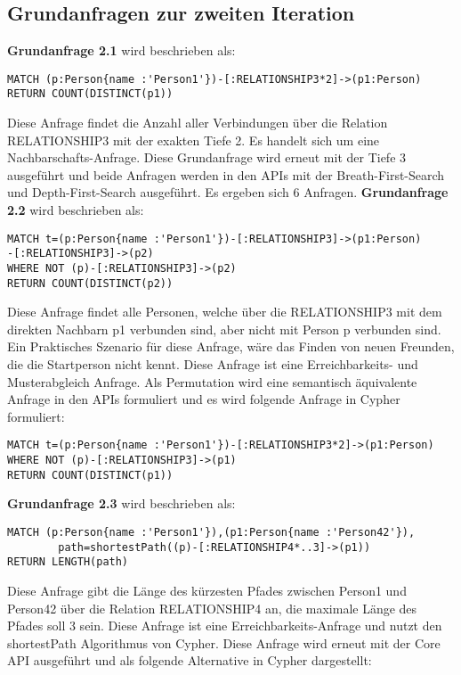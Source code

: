\subsection{Grundanfragen zur zweiten Iteration}
\textbf{Grundanfrage 2.1} wird beschrieben als: 
\begin{Verbatim}[frame=single]
MATCH (p:Person{name :'Person1'})-[:RELATIONSHIP3*2]->(p1:Person) 
RETURN COUNT(DISTINCT(p1))
\end{Verbatim} 
Diese Anfrage findet die Anzahl aller Verbindungen über die Relation RELATIONSHIP3 mit der exakten Tiefe 2. Es handelt sich um eine Nachbarschafts-Anfrage. Diese Grundanfrage wird erneut mit der Tiefe 3 ausgeführt und beide Anfragen werden in den APIs mit der Breath-First-Search und Depth-First-Search ausgeführt. Es ergeben sich 6 Anfragen. \newline \newline
\textbf{Grundanfrage 2.2} wird beschrieben als: 
\begin{Verbatim}[frame=single]
MATCH t=(p:Person{name :'Person1'})-[:RELATIONSHIP3]->(p1:Person)
-[:RELATIONSHIP3]->(p2)
WHERE NOT (p)-[:RELATIONSHIP3]->(p2) 
RETURN COUNT(DISTINCT(p2))
\end{Verbatim} 
Diese Anfrage findet alle Personen, welche über die RELATIONSHIP3 mit dem direkten Nachbarn  p1 verbunden sind, aber nicht mit Person p verbunden sind. Ein Praktisches Szenario für diese Anfrage, wäre das Finden von neuen Freunden, die die Startperson nicht kennt. Diese Anfrage ist eine Erreichbarkeits- und Musterabgleich Anfrage. Als Permutation wird eine semantisch äquivalente Anfrage in den APIs formuliert und es wird folgende Anfrage in Cypher formuliert:
\begin{Verbatim}[frame=single]
MATCH t=(p:Person{name :'Person1'})-[:RELATIONSHIP3*2]->(p1:Person)
WHERE NOT (p)-[:RELATIONSHIP3]->(p1)
RETURN COUNT(DISTINCT(p1))
\end{Verbatim} 
\textbf{Grundanfrage 2.3} wird beschrieben als: 
\begin{Verbatim}[frame=single]
MATCH (p:Person{name :'Person1'}),(p1:Person{name :'Person42'}),
		path=shortestPath((p)-[:RELATIONSHIP4*..3]->(p1)) 
RETURN LENGTH(path)
\end{Verbatim} 
Diese Anfrage gibt die Länge des kürzesten Pfades zwischen Person1 und Person42 über die Relation RELATIONSHIP4 an, die maximale Länge des Pfades soll  3 sein. Diese Anfrage ist eine Erreichbarkeits-Anfrage und nutzt den shortestPath Algorithmus von Cypher. Diese Anfrage wird erneut mit der Core API ausgeführt und als folgende Alternative in Cypher dargestellt: 

